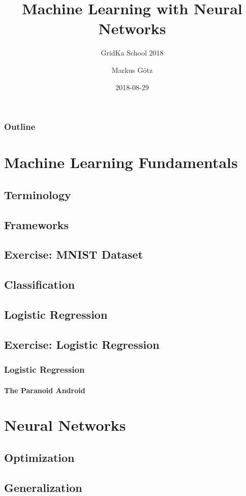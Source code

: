 \documentclass[aspectratio=169]{beamer}
\title{Machine Learning with Neural Networks}
\subtitle{GridKa School 2018}
\author{Markus Götz}
\date{2018-08-29}
\institute{KIT}
\begin{document}
\maketitle

\begin{frame}
\frametitle{Outline}
    \tableofcontents[hideallsubsections]
\end{frame}

\section{Machine Learning Fundamentals}

\subsection{Terminology}
\subsection{Frameworks}
\subsection{Exercise: MNIST Dataset}
\subsection{Classification}
\subsection{Logistic Regression}
\subsection{Exercise: Logistic Regression}

\begin{frame}
    \frametitle{Logistic Regression}
    \framesubtitle{The Paranoid Android}
\end{frame}

\section{Neural Networks}

\subsection{Optimization}
\subsection{Generalization}
\end{document}
